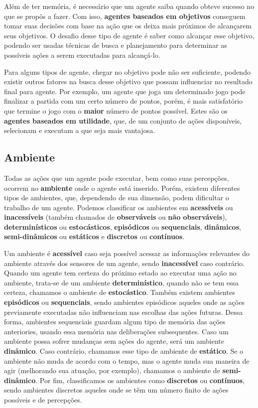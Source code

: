 Além de ter memória, é necessário que um agente saiba quando obteve sucesso no
que se propôs a fazer. Com isso, \textbf{agentes baseados em objetivos}
conseguem tomar suas decisões com base na ação que os deixa mais próximos de
alcançarem seus objetivos. O desafio desse tipo de agente é saber como alcançar
esse objetivo, podendo ser usadas técnicas de busca e planejamento para
determinar as possíveis ações a serem executadas para alcançá-lo.

Para alguns tipos de agente, chegar no objetivo pode não ser suficiente,
podendo existir outros fatores na busca desse objetivo que possam influenciar
no resultado final para agente. Por exemplo, um agente que joga um determinado
jogo pode finalizar a partida com um certo número de pontos, porém, é mais
satisfatório que termine o jogo com o \textbf{maior} número de pontos
possível. Estes são os \textbf{agentes baseados em utilidade}, que, de um
conjunto de ações disponíveis, selecionam e executam a que seja mais vantajosa.

\subsection{Ambiente}
Todas as ações que um agente pode executar, bem como suas percepções, ocorrem
no \textbf{ambiente} onde o agente está inserido. Porém, existem diferentes
tipos de ambientes, que, dependendo de sua dimensão, podem dificultar o trabalho
de um agente. Podemos classificar os ambientes em \textbf{acessíveis} ou
\textbf{inacessíveis} (também chamados de \textbf{observáveis} ou \textbf{não
observáveis}), \textbf{determinísticos} ou \textbf{estocásticos},
\textbf{episódicos} ou \textbf{sequenciais}, \textbf{dinâmicos},
\textbf{semi-dinâmicos} ou \textbf{estáticos} e \textbf{discretos} ou
\textbf{contínuos}.

Um ambiente é \textbf{acessível} caso seja possível acessar as informações relevantes do
ambiente através dos sensores de um agente, sendo \textbf{inacessível} caso
contrário. Quando um agente tem certeza do próximo estado ao executar uma ação
no ambiente, trata-se de um ambiente \textbf{determinístico}, quando não se tem
essa certeza, chamamos o ambiente de \textbf{estocástico}. Também existem
ambientes \textbf{episódicos} ou \textbf{sequenciais}, sendo ambientes
episódicos aqueles onde as ações previamente executadas não influenciam nas
escolhas das ações futuras. Dessa forma, ambientes sequenciais guardam algum
tipo de memória das ações anteriories, usando essa memória nas deliberações
subsequentes. Caso um ambiente possa sofrer mudanças sem ações do agente, será
um ambiente \textbf{dinâmico}. Caso contrário, chamamos esse tipo de ambiente
de \textbf{estático}. Se o ambiente não muda de acordo com o tempo, mas o
agente muda sua maneira de agir (melhorando sua atuação, por exemplo), chamamos
o ambiente de \textbf{semi-dinâmico}. Por fim, classificamos os ambientes como
\textbf{discretos} ou \textbf{contínuos}, sendo ambientes discretos aqueles
onde se têm um número finito de ações possíveis e de percepções.


